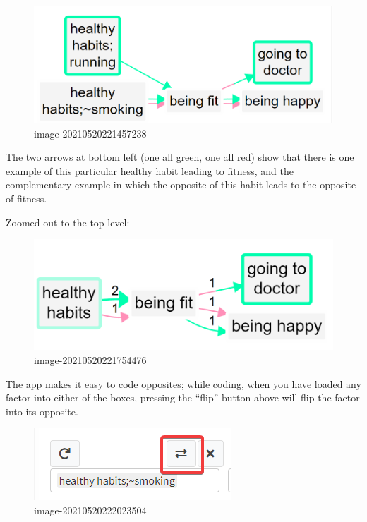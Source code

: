 \documentclass[
]{book}
\begin{document}
\begin{figure}
\centering
\includegraphics[width=6.77083in,height=\textheight]{_assets/image-20210520221457238.png}
\caption{image-20210520221457238}
\end{figure}

The two arrows at bottom left (one all green, one all red) show that there is one example of this particular healthy habit leading to fitness, and the complementary example in which the opposite of this habit leads to the opposite of fitness.

Zoomed out to the top level:

\begin{figure}
\centering
\includegraphics{_assets/image-20210520221754476.png}
\caption{image-20210520221754476}
\end{figure}

The app makes it easy to code opposites; while coding, when you have loaded any factor into either of the boxes, pressing the ``flip'' button above will flip the factor into its opposite.

\begin{figure}
\centering
\includegraphics{_assets/image-20210520222023504.png}
\caption{image-20210520222023504}
\end{figure}
\end{document}
